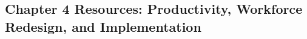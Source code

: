 \begin{refsection}
\chapter{Chapter 4 Resources: Productivity, Workforce Redesign, and Implementation}
\label{chap:comp-ch04}



\printbibliography[heading=subbibliography,title={Chapter 4 References}]
\end{refsection}
